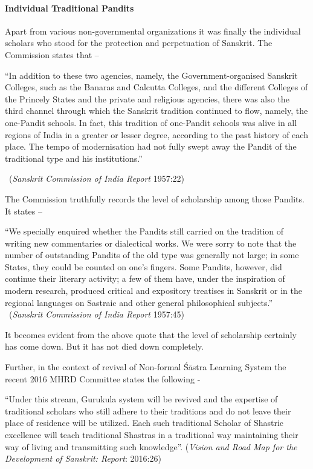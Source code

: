 \paragraph{Individual Traditional Pandits}

Apart from various non-governmental organizations it was finally the individual scholars who stood for the protection and perpetuation of Sanskrit. The Commission states that –
\begin{myquote}
\eleven
“In addition to these two agencies, namely, the Government-organised Sanskrit Colleges, such as the Banaras and Calcutta Colleges, and the different Colleges of the Princely States and the private and religious agencies, there was also the third channel through which the Sanskrit tradition continued to flow, namely, the one-Pandit schools. In fact, this tradition of one-Pandit schools was alive in all regions of India in a greater or lesser degree, according to the past history of each place. The tempo of modernisation had not fully swept away the Pandit of the traditional type and his institutions.” 
\vskip -5pt

~\hfill({\sl Sanskrit Commission of India Report }1957:22)
\end{myquote}

The Commission truthfully records the level of scholarship among those Pandits. It states –
\begin{myquote}
\eleven
“We specially enquired whether the Pandits still carried on the tradition of writing new commentaries or dialectical works. We were sorry to note that the number of outstanding Pandits of the old type was generally not large; in some States, they could be counted on one's fingers. Some Pandits, however, did continue their literary activity; a few of them have, under the inspiration of modern research, produced critical and expository treatises in Sanskrit or in the regional languages on Sastraic and other general philosophical subjects.”\\[-15pt] 

~\hfill({\sl Sanskrit Commission of India Report} 1957:45)
\end{myquote}

It becomes evident from the above quote that the level of scholarship certainly has come down. But it has not died down completely. 

Further, in the context of revival of Non-formal Śāstra Learning System the recent 2016 MHRD Committee states the following - 
\begin{myquote}
\eleven
“Under this stream, Gurukula system will be revived and the expertise of traditional scholars who still adhere to their traditions and do not leave their place of residence will be utilized. Each such traditional Scholar of Shastric excellence will teach traditional Shastras in a traditional way maintaining their way of living and transmitting such knowledge”. \hfill({\sl Vision and Road Map for the Development of Sanskrit: Report}: 2016:26) 
\end{myquote}
	
